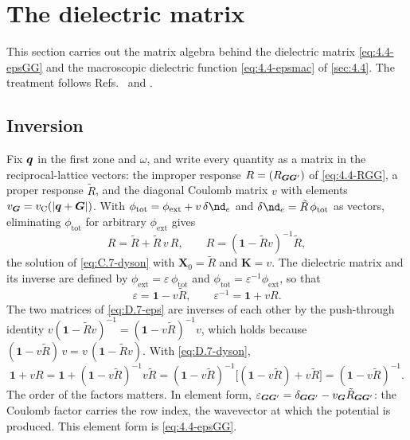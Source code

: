 \section{The dielectric matrix}\label{app:D.7}

This section carries out the matrix algebra behind the dielectric matrix \cref{eq:4.4-epsGG} and the macroscopic dielectric function \cref{eq:4.4-epsmac} of \cref{sec:4.4}. The treatment follows Refs.~\cite{adler1962quantum,wiser1963dielectric} and \cite{onida2002electronic}.

\subsection*{Inversion}

Fix $\bm{q}$ in the first zone and $\omega$, and write every quantity as a matrix in the reciprocal-lattice vectors: the improper response $R = (R_{\bm{G}\bm{G}'})$ of \cref{eq:4.4-RGG}, a proper response $\tilde R$, and the diagonal Coulomb matrix $v$ with elements $v_{\bm{G}} = v_{\mathrm{C}}(|\bm{q}+\bm{G}|)$. With $\phi_{\mathrm{tot}} = \phi_{\mathrm{ext}} + v\,\delta\nd_e$ and $\delta\nd_e = \tilde R\,\phi_{\mathrm{tot}}$ as vectors, eliminating $\phi_{\mathrm{tot}}$ for arbitrary $\phi_{\mathrm{ext}}$ gives
\begin{equation}
  R = \tilde R + \tilde R\,v\,R, \qquad R = (\mathbf{1} - \tilde Rv)^{-1}\tilde R ,
  \label{eq:D.7-dyson}
\end{equation}
the solution of \cref{eq:C.7-dyson} with $\mathbf{X}_0 = \tilde R$ and $\mathbf{K} = v$. The dielectric matrix and its inverse are defined by $\phi_{\mathrm{ext}} = \varepsilon\,\phi_{\mathrm{tot}}$ and $\phi_{\mathrm{tot}} = \varepsilon^{-1}\phi_{\mathrm{ext}}$, so that
\begin{equation}
  \varepsilon = \mathbf{1} - v\tilde R, \qquad \varepsilon^{-1} = \mathbf{1} + vR .
  \label{eq:D.7-eps}
\end{equation}
The two matrices of \cref{eq:D.7-eps} are inverses of each other by the push-through identity $v(\mathbf{1} - \tilde Rv)^{-1} = (\mathbf{1} - v\tilde R)^{-1}v$, which holds because $(\mathbf{1} - v\tilde R)\,v = v\,(\mathbf{1} - \tilde Rv)$. With \cref{eq:D.7-dyson},
\begin{equation*}
  \mathbf{1} + vR = \mathbf{1} + (\mathbf{1} - v\tilde R)^{-1}v\tilde R = (\mathbf{1} - v\tilde R)^{-1}\bigl[(\mathbf{1} - v\tilde R) + v\tilde R\bigr] = (\mathbf{1} - v\tilde R)^{-1} .
\end{equation*}
The order of the factors matters. In element form, $\varepsilon_{\bm{G}\bm{G}'} = \delta_{\bm{G}\bm{G}'} - v_{\bm{G}}\tilde R_{\bm{G}\bm{G}'}$: the Coulomb factor carries the row index, the wavevector at which the potential is produced. This element form is \cref{eq:4.4-epsGG}.

